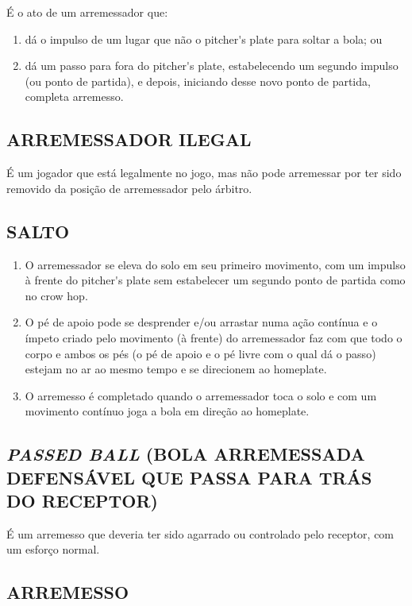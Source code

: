 É o ato de um arremessador que:
\begin{enumerate}[label=(\alph*)]
	\item dá o impulso de um lugar que não o \gls{pitcher's plate} para soltar a bola; ou
	\item dá um passo para fora do \gls{pitcher's plate}, estabelecendo um segundo impulso (ou ponto de partida), e depois, iniciando desse novo ponto de partida, completa arremesso.
\end{enumerate}
\subsection{ARREMESSADOR ILEGAL}

É um jogador que está legalmente no jogo, mas não pode arremessar por ter sido removido da posição de arremessador pelo árbitro.

\subsection{SALTO}

\begin{enumerate}[label=(\alph*)]
	\item O arremessador se eleva do solo em seu primeiro movimento, com um impulso à frente do \gls{pitcher's plate} sem estabelecer um segundo ponto de partida como no \gls{crow hop}.
	\item O pé de apoio pode se desprender e/ou arrastar numa ação contínua e o ímpeto criado pelo movimento (à frente) do arremessador faz com que todo o corpo e ambos os pés (o pé de apoio e o pé livre com o qual dá o passo) estejam no ar ao mesmo tempo e se direcionem ao \gls{homeplate}.
	\item O arremesso é completado quando o arremessador toca o solo e com um movimento contínuo joga a bola em direção ao \gls{homeplate}.

\end{enumerate}

\subsection{\textit{PASSED BALL} (BOLA ARREMESSADA DEFENSÁVEL QUE PASSA PARA TRÁS DO RECEPTOR)}

É um arremesso que deveria ter sido agarrado ou controlado pelo receptor, com um esforço normal.

\subsection{ARREMESSO}

